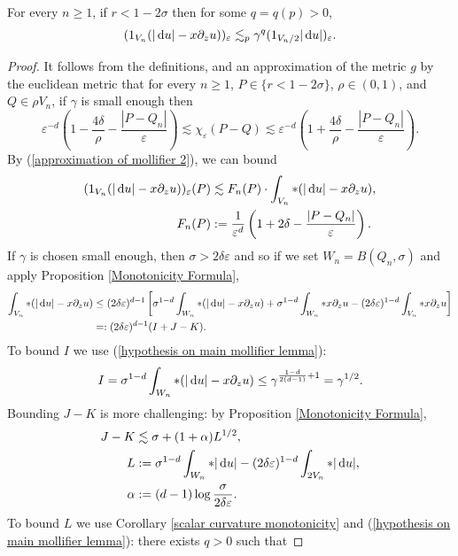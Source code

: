 \begin{sublemma}
For every $n \geq 1$, if $r < 1 - 2\sigma$ then for some $q = q(p) > 0$,
$$(1_{V_n}(|\mathop{}\!\mathrm{d} u| - x\partial_z u))_\varepsilon \lesssim_p \gamma^q (1_{V_n/2}|\mathop{}\!\mathrm{d} u|)_\varepsilon.$$
\end{sublemma}
\begin{proof}
It follows from the definitions, and an approximation of the metric $g$ by the euclidean metric that for every $n \geq 1$, $P \in \{r < 1 - 2\sigma\}$, $\rho \in (0, 1)$, and $Q \in \rho V_n$, if $\gamma$ is small enough then
\begin{equation}\label{approximation of mollifier 2}
\varepsilon^{-d}\left(1 - \frac{4\delta}{\rho} - \frac{|P - Q_n|}{\varepsilon}\right) \lesssim \chi_\varepsilon(P - Q) \lesssim \varepsilon^{-d}\left(1 + \frac{4\delta}{\rho} - \frac{|P - Q_n|}{\varepsilon}\right).
\end{equation}
By (\ref{approximation of mollifier 2}), we can bound
\begin{align*}
(1_{V_n}(|\mathop{}\!\mathrm{d} u| - x\partial_z u))_\varepsilon(P) &\lesssim F_n(P) \cdot \int_{V_n} *(|\mathop{}\!\mathrm{d} u| - x\partial_z u), \\
F_n(P) &:= \frac{1}{\varepsilon^d}\left(1 + 2\delta - \frac{|P - Q_n|}{\varepsilon}\right).
\end{align*}
If $\gamma$ is chosen small enough, then $\sigma > 2\delta\varepsilon$ and so if we set $W_n = B(Q_n, \sigma)$ and apply Proposition \ref{Monotonicity Formula},
\begin{align*}
\int_{V_n} *(|\mathop{}\!\mathrm{d} u| - x\partial_z u) &\leq (2\delta\varepsilon)^{d - 1}
 \left[\sigma^{1 - d}\int_{W_n} *(|\mathop{}\!\mathrm{d} u| - x\partial_z u) + \sigma^{1 - d}\int_{W_n} *x\partial_z u - (2\delta\varepsilon)^{1 - d}\int_{V_n} *x\partial_z u\right]\\
 &=: (2\delta\varepsilon)^{d - 1} (I + J - K).
\end{align*}
To bound $I$ we use (\ref{hypothesis on main mollifier lemma}):
$$I = \sigma^{1 - d}\int_{W_n} *(|\mathop{}\!\mathrm{d} u| - x\partial_z u) \leq \gamma^{\frac{1 - d}{2(d - 1)} + 1} = \gamma^{1/2}.$$
Bounding $J - K$ is more challenging: by Proposition \ref{Monotonicity Formula},
\begin{align*}
J - K &\lesssim \sigma + (1 + \alpha)L^{1/2},\\
L &:= \sigma^{1 - d} \int_{W_n} *|\mathop{}\!\mathrm{d} u| - (2\delta\varepsilon)^{1 - d} \int_{2V_n} *|\mathop{}\!\mathrm{d} u|,\\
\alpha &:= (d - 1)\log \frac{\sigma}{2\delta\varepsilon}.
\end{align*}
To bound $L$ we use Corollary \ref{scalar curvature monotonicity} and (\ref{hypothesis on main mollifier lemma}): there exists $q > 0$ such that

\end{proof}
